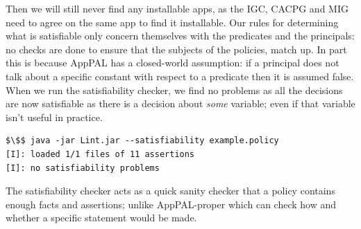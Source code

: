 \documentclass[thesis.tex]{subfiles}
\begin{document}
Then we will still never find any installable apps, as the \ac{IGC}, \ac{CACPG}
and \ac{MIG} need to agree on the same app to find it installable. Our rules for
determining what is satisfiable only concern themselves with the predicates and
the principals: no checks are done to ensure that the subjects of the policies,
match up. In part this is because AppPAL has a closed-world assumption: if a
principal does not talk about a specific constant with respect to a predicate
then it is assumed false. When we run the satisfiability checker, we find no
problems as all the decisions are now satisfiable as there is a decision about
\emph{some} variable; even if that variable isn't useful in practice.

\noindent\begin{minipage}{\linewidth}
\begin{lstlisting}
$\$$ java -jar Lint.jar --satisfiability example.policy
[I]: loaded 1/1 files of 11 assertions
[I]: no satisfiability problems
\end{lstlisting}
\end{minipage}

The satisfiability checker acts as a quick sanity checker that a policy contains
enough facts and assertions; unlike AppPAL-proper which can check how and
whether a specific statement would be made.  

%
\end{document}
